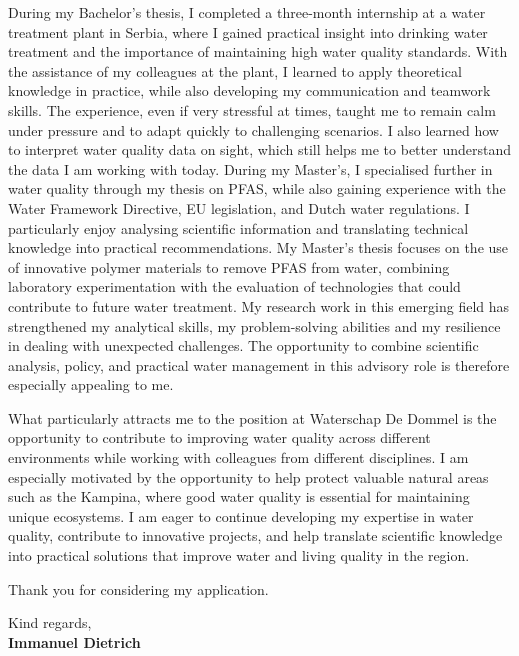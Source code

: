 \documentclass[11pt]{report}
\begin{document}
\begin{titlepage}
\vspace{0.7em}

During my Bachelor's thesis, I completed a three-month internship at a water treatment plant in Serbia, where I gained practical insight into drinking water treatment and the importance of maintaining high water quality standards. 
With the assistance of my colleagues at the plant, I learned to apply theoretical knowledge in practice, while also developing my communication and teamwork skills. The experience, even if very stressful at times, 
taught me to remain calm under pressure and to adapt quickly to challenging scenarios. I also learned how to interpret water quality data on sight, which still helps me to better understand the data I am working with today. 
During my Master's, I specialised further in water quality through my thesis on PFAS, while also gaining experience with the Water Framework Directive, EU legislation, and Dutch water regulations. 
I particularly enjoy analysing scientific information and translating technical knowledge into practical recommendations. My Master's thesis focuses on the use of innovative polymer materials to remove PFAS from water, 
combining laboratory experimentation with the evaluation of technologies that could contribute to future water treatment. My research work in this emerging field has strengthened my analytical skills, my problem-solving abilities 
and my resilience in dealing with unexpected challenges. The opportunity to combine scientific analysis, policy, and practical water management in this advisory role is therefore especially appealing to me.

\vspace{0.7em}

What particularly attracts me to the position at Waterschap De Dommel is the opportunity to contribute to improving water quality across different environments while working with colleagues from different disciplines. 
I am especially motivated by the opportunity to help protect valuable natural areas such as the Kampina, where good water quality is essential for maintaining unique ecosystems. 
I am eager to continue developing my expertise in water quality, contribute to innovative projects, and help translate scientific knowledge into practical solutions that improve water and living quality in the region.

\vspace{0.7em}

Thank you for considering my application.

\vspace{0.7em}

\raggedright Kind regards,\\
\textbf{Immanuel Dietrich}

\end{titlepage}
\end{document}
